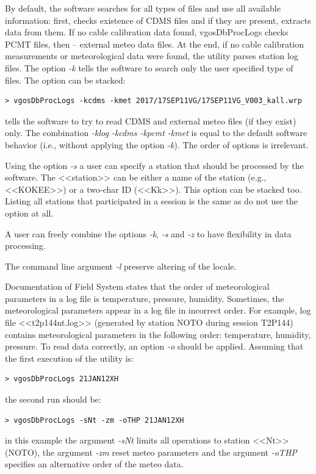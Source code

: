 \documentclass [10pt,letterpaper]{report}
\begin{document}
By default, the software searches for all types of files and use all available
information: first, checks existence of CDMS files and if they are present,
extracts data from them. If no cable calibration data found, vgosDbProcLogs
checks PCMT files, then -- external meteo data files. At the end, if no cable
calibration measurements or meteorological data were found, the utility
parses station log files. The option {\sl -k} tells the software to search
only the user specified type of files.
The option can be stacked:
\begin{verbatim}
> vgosDbProcLogs -kcdms -kmet 2017/17SEP11VG/17SEP11VG_V003_kall.wrp
\end{verbatim}
\noindent
tells the software to try to read CDMS and external meteo files (if they exist) only.
The combination {\sl -klog -kcdms -kpcmt -kmet} is equal to the default software
behavior (i.e., without applying the option {\sl -k}). The order of options is
irrelevant.

Using the option {\sl -s} a user can specify a station that should be processed
by the software. The <<station>> can be either a name of the station (e.g., <<KOKEE>>)
or a two-char ID (<<Kk>>). This option can be stacked too. Listing all
stations that participated in a session is the same as do not use the option
at all.

A user can freely combine the options {\sl -k}, {\sl -s} and {\sl -z} to have
flexibility in data processing.

The command line argument {\sl -l} preserve altering of the locale.

Documentation of Field System states that the order of meteorological parameters
in a log file is temperature, pressure, humidity. Sometimes, the meteorological
parameters appear in a log file in incorrect order. For example, log file
<<t2p144nt.log>> (generated by station NOTO during session T2P144) contains
meteorological parameters in the following order: temperature, humidity, pressure.
To read data correctly, an option {\sl -o} should be applied. Assuming that the
first execution of the utility is:
\begin{verbatim}
> vgosDbProcLogs 21JAN12XH
\end{verbatim}
\noindent
the second run should be:
\begin{verbatim}
> vgosDbProcLogs -sNt -zm -oTHP 21JAN12XH
\end{verbatim}
\noindent
in this example the argument {\sl -sNt} limits all operations to station <<Nt>> (NOTO),
the argument {\sl -zm} reset meteo parameters and the argument {\sl -oTHP} specifies an
alternative order of the meteo data.
\end{document}
